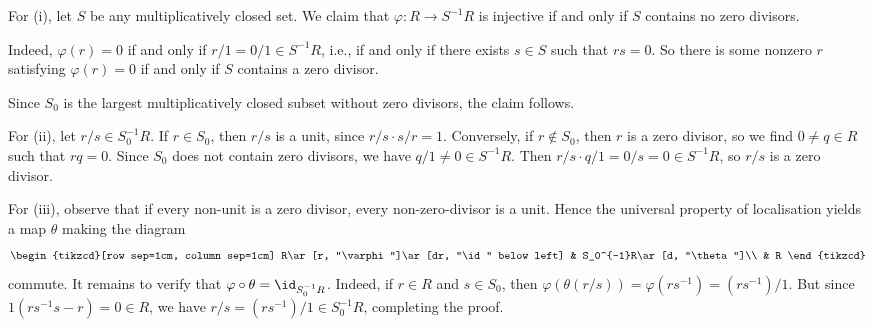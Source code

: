 For (i), let $S$ be any multiplicatively closed set. We claim that $\varphi\colon R\to S^{-1}R$ is injective
if and only if $S$ contains no zero divisors.

Indeed, $\varphi(r) = 0$ if and only if $r/1 = 0/1 \in S^{-1}R$, i.e., if and only if
there exists $s \in S$ such that $rs = 0$. So there is
some nonzero $r$ satisfying $\varphi(r) = 0$ if and only if $S$ contains a zero divisor.

Since $S_0$ is the largest multiplicatively closed subset without zero divisors,
the claim follows.

For (ii), let $r/s \in S_0^{-1}R$. If $r \in S_0$, then $r/s$ is a unit, since
$r/s \cdot s/r = 1$. Conversely, if $r \notin S_0$, then $r$ is a zero divisor,
so we find $0\neq q \in R$ such that $rq = 0$. Since $S_0$ does not contain zero divisors,
we have $q/1 \neq 0 \in S^{-1}R$. Then $r/s \cdot q/1 = 0/s = 0 \in S^{-1}R$,
so $r/s$ is a zero divisor.

For (iii), observe that if every non-unit is a zero divisor, every non-zero-divisor
is a unit. Hence the universal property of localisation yields a map $\theta$
making the diagram
\[\begin{tikzcd}[row sep=1cm, column sep=1cm]
	R\ar[r, "\varphi"]\ar[dr, "\id" below left] & S_0^{-1}R\ar[d, "\theta"]\\
	& R
\end{tikzcd}\]
commute. It remains to verify that $\varphi \circ \theta = \id_{S_0^{-1}R}$. Indeed,
if $r \in R$ and $s \in S_0$, then $\varphi(\theta(r/s)) = \varphi(rs^{-1}) = (rs^{-1})/1$.
But since $1(rs^{-1}s - r) = 0 \in R$, we have $r/s = (rs^{-1})/1 \in S_0^{-1}R$,
completing the proof.

